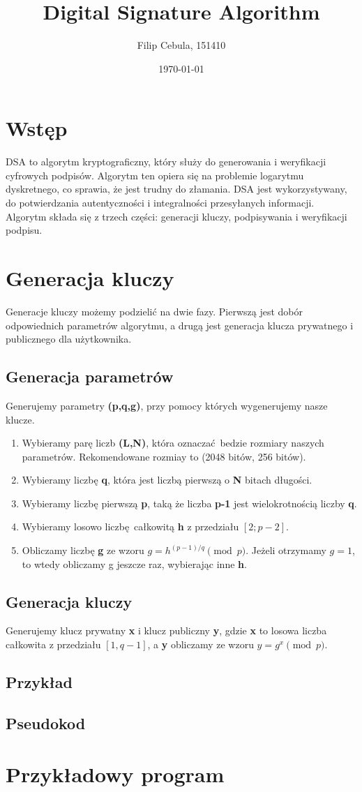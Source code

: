 \documentclass[11pt]{article}
\title{Digital Signature Algorithm}
\author{Filip Cebula, 151410}
\date{\today}
\begin{document}
\maketitle
\pagebreak

\section{Wstęp}
DSA to algorytm kryptograficzny, który służy do generowania i weryfikacji
cyfrowych podpisów. Algorytm ten opiera się na problemie logarytmu
dyskretnego, co sprawia, że jest trudny do złamania. DSA jest
wykorzystywany, do potwierdzania autentyczności i integralności przesyłanych
informacji. Algorytm składa się z trzech części: generacji kluczy, podpisywania
i weryfikacji podpisu.

\section{Generacja kluczy}
Generacje kluczy możemy podzielić na dwie fazy. Pierwszą jest dobór
odpowiednich parametrów algorytmu, a drugą jest generacja klucza prywatnego
i publicznego dla użytkownika.

\subsection{Generacja parametrów}
Generujemy parametry \textbf{(p,q,g)}, przy pomocy których wygenerujemy nasze
klucze.
\begin{enumerate}
  \item Wybieramy parę liczb \textbf{(L,N)}, która oznaczać bedzie rozmiary
    naszych parametrów. Rekomendowane rozmiay to (2048 bitów, 256 bitów).
  \item Wybieramy liczbę \textbf{q}, która jest liczbą pierwszą o \textbf{N}
    bitach długości.
  \item Wybieramy liczbę pierwszą \textbf{p}, taką że liczba \textbf{p-1} jest
    wielokrotnością liczby \textbf{q}.
  \item Wybieramy losowo liczbę całkowitą \textbf{h} z przedziału $[2; p-2]$.
  \item Obliczamy liczbę \textbf{g} ze wzoru $g=h^{(p-1)/q} \pmod p$. Jeżeli
    otrzymamy $g=1$, to wtedy obliczamy g jeszcze raz, wybierając inne
    \textbf{h}.
\end{enumerate}

\subsection{Generacja kluczy}
Generujemy klucz prywatny \textbf{x} i klucz publiczny \textbf{y}, gdzie
\textbf{x} to losowa liczba całkowita z przedziału $[1,q-1]$, a \textbf{y}
obliczamy ze wzoru $y=g^{x} \pmod p$.

\subsection{Przykład}

\subsection{Pseudokod}

\section{Przykładowy program}
\end{document}
